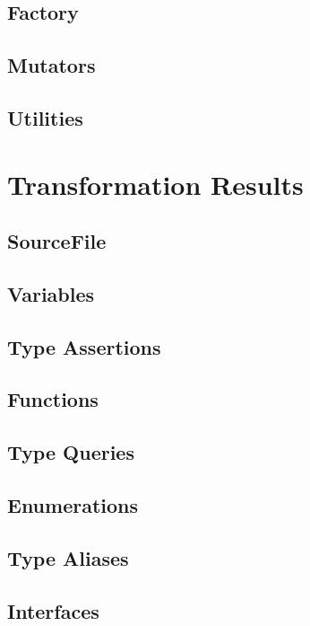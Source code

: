 \subsection{Factory}

\subsection{Mutators}


\subsection{Utilities}

\section{Transformation Results}
\label{sec:transformation-results}

\subsection{SourceFile}

\subsection{Variables}

\subsection{Type Assertions}

\subsection{Functions}

\subsection{Type Queries}

\subsection{Enumerations}

\subsection{Type Aliases}

\subsection{Interfaces}


